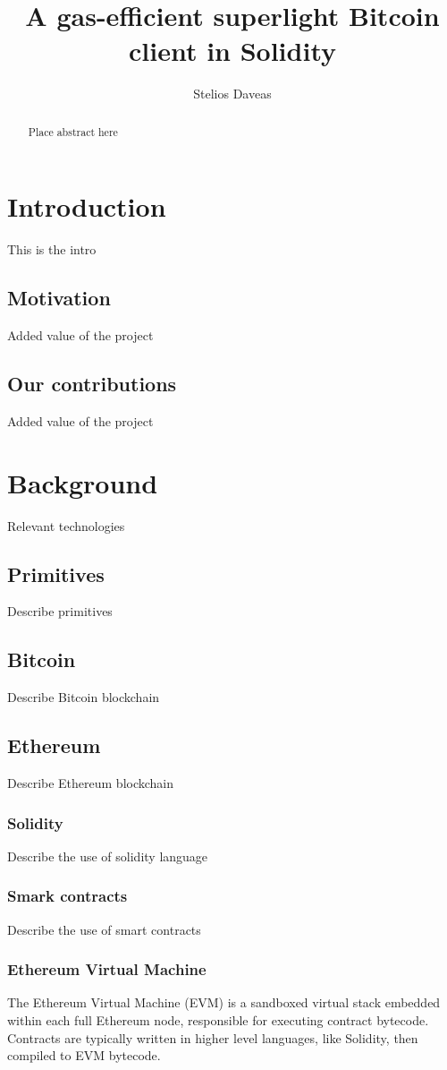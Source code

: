 \documentclass{article}
\title{A gas-efficient superlight Bitcoin client in Solidity}
\author{Stelios Daveas}
\begin{document}
\maketitle

\begin{abstract}
Place abstract here
\end{abstract}

\section{Introduction}
This is the intro
\subsection{Motivation}
Added value of the project
\subsection{Our contributions}
Added value of the project

\section{Background}
Relevant technologies
\subsection{Primitives}
Describe primitives
\subsection{Bitcoin}
Describe Bitcoin blockchain
\subsection{Ethereum}
Describe Ethereum blockchain
\subsubsection{Solidity}
Describe the use of solidity language
\subsubsection{Smark contracts}
Describe the use of smart contracts
\subsubsection{Ethereum Virtual Machine}
The Ethereum Virtual Machine (EVM) is a sandboxed virtual stack embedded within each full Ethereum node, responsible for executing contract bytecode. Contracts are typically written in higher level languages, like Solidity, then compiled to EVM bytecode.
\end{document}
